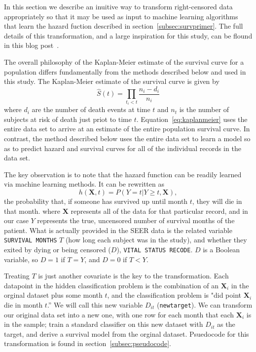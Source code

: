 \documentclass[a4paper,11pt]{article}
\newcommand{\codewhite}[1]{\colorbox{white}{\texttt{#1}}}
\begin{document}
In this section we describe an inuitive way to transform right-censored data appropriately so that it may be used as input to machine learning algorithms that learn the hazard fuction described in section~\ref{subsec:survprimer}. The full details of this transformation, and a large inspiration for this study, can be flound in this blog post~\cite{kuhn}.

The overall philosophy of the Kaplan-Meier estimate of the survival curve for a population differs fundamentally from the methods described below and used in this study. 
The Kaplan-Meier estimate of the survival curve is given by
\begin{equation}
\label{eq:kaplanmeier}
\hat{S}(t) = \prod_{t_i < t} \frac{n_i - d_i}{n_i}
\end{equation}
where $d_i$ are the number of death events at time $t$ and $n_t$ is the number of subjects at risk of death just priot to time $t$. 
Equation~\ref{eq:kaplanmeier} uses the entire data set to arrive at an estimate of the entire population survival curve. In contrast, the method described below uses the entire data set to learn a model so as to predict hazard and survival curves for all of the individual records in the data set.

The key observation is to note that the hazard function can be readily learned via machine learning methods. It can be rewritten as
\begin{equation}
\label{eq:hhazard}
h(\mathbf{X}, t) = P(Y = t|Y \geq t, \mathbf{X}),
\end{equation}
the probability that, if someone has survived up until month $t$, they will die in that month.
where $\mathbf{X}$ represents all of the data for that particular record, and in our case $Y$ represents the true, uncensored number of survival months of the patient.
What is actually provided in the SEER data is the related variable \codewhite{SURVIVAL MONTHS} $T$ (how long each subject was in the study), and whether they exited by dying or being censored ($D$), \codewhite{VITAL STATUS RECODE}. 
$D$ is a Boolean variable, so $D = 1$ if $T = Y$, and $D = 0$ if $T < Y$.

Treating $T$ is just another covariate is the key to the transformation. Each datapoint in the hidden classification problem is the combination of an $\mathbf{X}_{i}$ in the orginal dataset plus some month $t$, and the classification problem is "did point $\mathbf{X}_{i}$ die in month $t$.'' We will call this new variable $D_{it}$ (\codewhite{newtarget}).
We can transform our original data set into a new one, with one row for each month that each $\mathbf{X}_{i}$ is in the sample; train a standard classifier on this new dataset with $D_{it}$ as the target, and derive a survival model from the orginal dataset.
Psuedocode for this transformation is found in section~\ref{subsec:pseudocode}.
\end{document}
